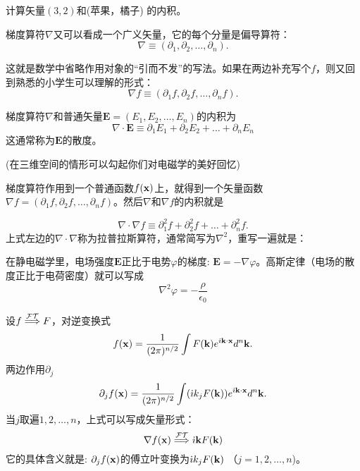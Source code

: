 \documentclass[CJK]{beamer}
\begin{document}
\begin{frame}
  \bch
  
  计算矢量$(3,2)$和(苹果，橘子) 的内积。
  \ech
\end{frame}

\begin{frame}
  \bch
  梯度算符$\nabla$又可以看成一个广义矢量，它的每个分量是偏导算符：
  $$\nabla \equiv (\partial_1, \partial_2,\ldots, \partial_n). $$

  这就是数学中省略作用对象的“引而不发”的写法。如果在两边补充写个$f$，则又回到熟悉的小学生可以理解的形式：
  $$\nabla f \equiv (\partial_1f, \partial_2f,\ldots, \partial_nf). $$
  \ech
\end{frame}

\begin{frame}
  \bch
  梯度算符$\nabla$和普通矢量$\mathbf{E} = (E_1, E_2, \ldots, E_n)$的内积为
  $$\nabla\cdot \mathbf{E} \equiv \partial_1 E_1 + \partial_2 E_2 + \ldots + \partial_n E_n $$
  这通常称为$\mathbf{E}$的{\blue 散度}。
  \skipline
  
  (在三维空间的情形可以勾起你们对电磁学的美好回忆\bye)
  \ech
\end{frame}

\begin{frame}
  \bch
  梯度算符作用到一个普通函数$f({\mathbf{x}})$上，就得到一个矢量函数$\nabla f = (\partial_1 f, \partial_2 f, \ldots, \partial_n f)$。然后$\nabla$和$\nabla f$的内积就是
  
  $$ \nabla \cdot \nabla f \equiv \partial_1^2 f + \partial_2^2 f + \ldots + \partial_n^2 f.$$
  上式左边的$\nabla\cdot \nabla$称为{\blue 拉普拉斯算符}，通常简写为{\blue $\nabla^2$}，重写一遍就是：
  
  {
    \small
  在静电磁学里，电场强度$\mathbf{E}$正比于电势$\varphi$的梯度: $\mathbf{E} = -\nabla \varphi$。高斯定律（电场的散度正比于电荷密度）就可以写成
  $$ \nabla^2 \varphi = -\frac{\rho}{\epsilon_0} $$}
  
  \ech
\end{frame}


\begin{frame}
  \chtitle{$\nabla \rightarrow \ii \veck$}
  \bch
  设$f \stackrel{\mathcal{FT}}{\Longrightarrow} F $，对逆变换式
  $$ f({\mathbf{x}}) = \frac{1}{(2\pi)^{n/2}}\int F({\mathbf{k}}) e^{{\dot{\imath}} {\mathbf{k}} \cdot {\mathbf{x}}} d^n{\mathbf{k}}. $$
  两边作用$\partial_j$
  $$ \partial_j f({\mathbf{x}}) =  \frac{1}{(2\pi)^{n/2}}\int ({\dot{\imath}} k_j F({\mathbf{k}})) e^{{\dot{\imath}} {\mathbf{k}} \cdot {\mathbf{x}}} d^n{\mathbf{k}}. $$
  当$j$取遍$1,2,\ldots, n$，上式可以写成矢量形式：
{\blue  $$ \nabla f({\mathbf{x}}) \stackrel{\mathcal{FT}}{\Longrightarrow} {\dot{\imath}} {\mathbf{k}} F({\mathbf{k}}) $$}
  它的具体含义就是: $\partial_jf({\mathbf{x}})$的傅立叶变换为$ {\dot{\imath}} k_j F({\mathbf{k}})$ （$j=1,2,\ldots, n$)。
  \ech
\end{frame}
\end{document}
